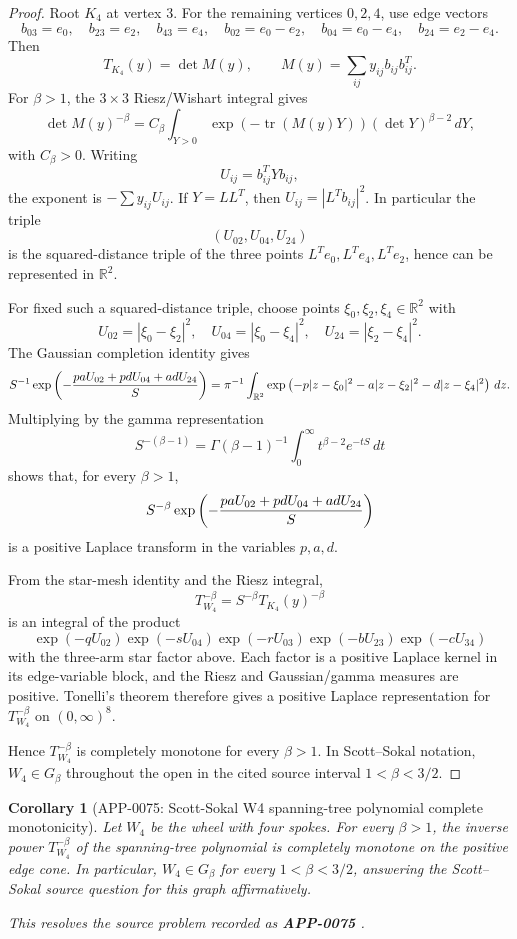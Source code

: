 \documentclass[11pt]{article}
\numberwithin{equation}{section}
\newtheorem{corollary}[theorem]{Corollary}
\theoremstyle{definition}
\theoremstyle{remark}
\newcommand{\1}{\mathbf 1}
\begin{document}
\begin{proof}
Root \(K_4\) at vertex \(3\). For the remaining vertices \(0,2,4\), use edge vectors
\[
b_{03}=e_0,\quad b_{23}=e_2,\quad b_{43}=e_4,\quad
b_{02}=e_0-e_2,\quad b_{04}=e_0-e_4,\quad b_{24}=e_2-e_4 .
\]
Then
\[
T_{K_4}(y)=\det M(y),\qquad
M(y)=\sum_{ij} y_{ij} b_{ij}b_{ij}^{T}.
\]
For \(\beta>1\), the \(3\times3\) Riesz/Wishart integral gives
\[
\det M(y)^{-\beta}
=C_\beta\int_{Y>0}
\exp\!\left(-\operatorname{tr}(M(y)Y)\right)
(\det Y)^{\beta-2}\,dY,
\]
with \(C_\beta>0\). Writing
\[
U_{ij}=b_{ij}^{T}Yb_{ij},
\]
the exponent is \(-\sum y_{ij}U_{ij}\). If \(Y=LL^T\), then \(U_{ij}=|L^Tb_{ij}|^2\). In particular the triple
\[
(U_{02},U_{04},U_{24})
\]
is the squared-distance triple of the three points \(L^Te_0,L^Te_4,L^Te_2\), hence can be represented in \(\mathbb R^2\).

For fixed such a squared-distance triple, choose points
\(\xi_0,\xi_2,\xi_4\in\mathbb R^2\) with
\[
U_{02}=|\xi_0-\xi_2|^2,\quad
U_{04}=|\xi_0-\xi_4|^2,\quad
U_{24}=|\xi_2-\xi_4|^2.
\]
The Gaussian completion identity gives
\[
S^{-1}\exp\left(
-{paU_{02}+pdU_{04}+adU_{24}\over S}
\right)
=\pi^{-1}\int_{\mathbb R^2}
\exp\left(-p|z-\xi_0|^2-a|z-\xi_2|^2-d|z-\xi_4|^2\right)\,dz .
\]
Multiplying by the gamma representation
\[
S^{-(\beta-1)}
=\Gamma(\beta-1)^{-1}\int_0^\infty t^{\beta-2}e^{-tS}\,dt
\]
shows that, for every \(\beta>1\),
\[
S^{-\beta}
\exp\left(
-{paU_{02}+pdU_{04}+adU_{24}\over S}
\right)
\]
is a positive Laplace transform in the variables \(p,a,d\).

From the star-mesh identity and the Riesz integral,
\[
T_{W_4}^{-\beta}
=S^{-\beta}T_{K_4}(y)^{-\beta}
\]
is an integral of the product
\[
\exp(-qU_{02})\exp(-sU_{04})\exp(-rU_{03})
\exp(-bU_{23})\exp(-cU_{34})
\]
with the three-arm star factor above. Each factor is a positive Laplace kernel in its edge-variable block, and the Riesz and Gaussian/gamma measures are positive. Tonelli's theorem therefore gives a positive Laplace representation for \(T_{W_4}^{-\beta}\) on \((0,\infty)^8\).

Hence \(T_{W_4}^{-\beta}\) is completely monotone for every \(\beta>1\). In Scott--Sokal notation, \(W_4\in G_\beta\) throughout the open in the cited source interval \(1<\beta<3/2\).
\end{proof}

\begin{corollary}[APP-0075: Scott-Sokal W4 spanning-tree polynomial complete monotonicity]
\label{res:w4-spanningtreepolynomial-cm-betage1}
Let \(W_4\) be the wheel with four spokes. For every \(\beta>1\), the inverse power \(T_{W_4}^{-\beta}\) of the spanning-tree polynomial is completely monotone on the positive edge cone. In particular, \(W_4\in G_\beta\) for every \(1<\beta<3/2\), answering the Scott--Sokal source question for this graph affirmatively.



This resolves the source problem recorded as \textbf{APP-0075} \cite{app-app-0074-source}.
\end{corollary}
\end{document}
